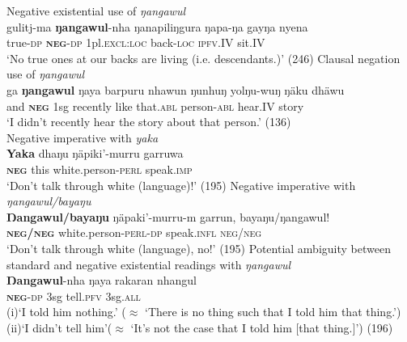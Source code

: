 \documentclass[output=paper,draft,draftmode,colorlinks,citecolor=brown]{langscibook}
\begin{document}
\begin{exe}\ex\label{ex:austr-wangurri-negstrat}
    \begin{xlist}
        \ex Negative existential use of {\em ŋangawul}\\
\gll gulitj-ma \textbf{ŋangawul}-nha ŋanapiliŋgura ŋapa-ŋa gayŋa nyena\\
true-\textsc{dp} \textsc{\textbf{neg}-dp} 1pl\textsc{.excl:loc} back\textsc{-loc} \textsc{ipfv}.IV sit.IV\\
\glt `No true ones at our backs are living (i.e. descendants.)'  (246)
%
\newpage
\ex Clausal negation use of {\em ŋangawul}\\
\gll ga \textbf{ŋangawul} ŋaya barpuru nhawun ŋunhuŋ yolŋu-wuŋ ŋäku dhäwu\\
and \textsc{\textbf{neg}} 1sg recently like that.\textsc{abl} person\textsc{-abl} hear\textsc{.IV} story\\
\glt  `I didn't recently hear the story about that person.'  (136)\\
%
\ex Negative imperative with {\em yaka}\\
\gll \textbf{Yaka} dhaŋu ŋäpiki'-murru garruwa\\
\textsc{\textbf{neg}} this white.person-\textsc{perl} speak\textsc{.imp}\\
\glt `Don't talk through white (language)!'  {(195)}
%
\ex Negative imperative with \emph{ŋangawul\slash bayaŋu}\\
\gll \textbf{Ŋangawul\slash bayaŋu} ŋäpaki'-murru-m garrun, bayaŋu/ŋangawul!\\
\textsc{\textbf{neg\slash neg}} white.person-\textsc{perl}-\textsc{dp}
        speak\textsc{.infl}\footnotemark{} \textsc{neg\slash neg}\\
\glt  `Don't talk through white (language), no!'  (195)
%
\ex\label{ex:austr-wangurri-negstrat-ambig}
    Potential ambiguity between standard and negative existential readings with \emph{ŋangawul}\\
\gll \textbf{Ŋangawul}-nha ŋaya rakaran nhangul\\
\textsc{\textbf{neg}}-\textsc{dp} 3sg tell.\textsc{pfv} 3sg.\textsc{all}\\
\glt (i)\quad`I told him nothing.' ($\approx$ `There is no thing such that I told him that thing.')\\
(ii)\quad `I didn't tell him'($\approx$ `It's not the case that I told him [that thing.]')  (196)
    \end{xlist}\end{exe}
\end{document}
